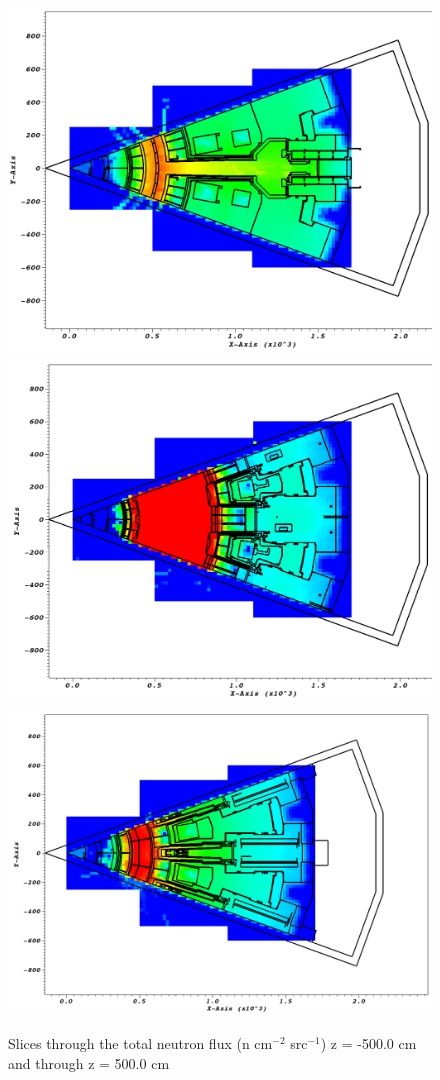\documentclass[12pt]{article}
\begin{document}
\begin{figure}[ht!]
  \centering
  \includegraphics[scale=0.27]{../plots/neutron/b4c/flux_z-500.png}
  \includegraphics[scale=0.27]{../plots/neutron/b4c/flux_z0.png}       
  \includegraphics[scale=0.27]{../plots/neutron/b4c/flux_z500.png}
  \caption{Slices through the total neutron flux (n cm$^{-2}$ src$^{-1}$) z = -500.0 cm and through z = 500.0 cm}
  \label{fig:wwinp}
\end{figure}
\end{document}
